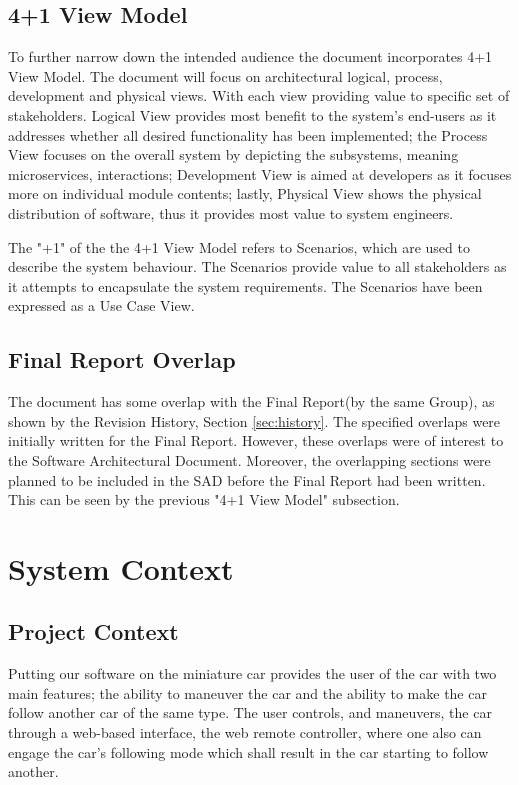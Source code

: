 \documentclass[12pt]{article}
\begin{document}
\subsection{4+1 View Model}
To further narrow down the intended audience the document incorporates 4+1 View Model. The document will focus on architectural logical, process, development and physical views. With each view providing value to specific set of stakeholders. Logical View provides most benefit to the system's end-users as it addresses whether all desired functionality has been implemented; the Process View focuses on the overall system by depicting the subsystems, meaning microservices, interactions; Development View is aimed at developers as it focuses more on individual module contents; lastly, Physical View shows the physical distribution of software, thus it provides most value to system engineers. \par
The "+1" of the the 4+1 View Model refers to Scenarios, which are used to describe the system behaviour. The Scenarios provide value to all stakeholders as it attempts to encapsulate the system requirements. The Scenarios have been expressed as a Use Case View. \par

\subsection{Final Report Overlap}
The document has some overlap with the Final Report\cite{FinalReport}(by the same Group), as shown by the Revision History, Section \ref{sec:history}. The specified overlaps were initially written for the Final Report. However, these overlaps were of interest to the Software Architectural Document. Moreover, the overlapping sections were planned to be included in the SAD before the Final Report had been written. This can be seen by the previous "4+1 View Model" subsection.

\pagebreak

\section{System Context}   
\subsection{Project Context}
Putting our software on the miniature car provides the user of the car with two main features; the ability to maneuver the car and the ability to make the car follow another car of the same type. The user controls, and maneuvers, the car through a web-based interface, the web remote controller, where one also can engage the car's following mode which shall result in the car starting to follow another.
\end{document}
